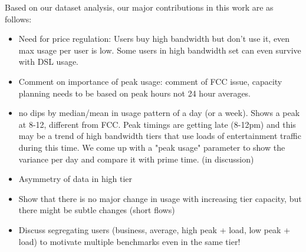 Based on our dataset analysis, our major contributions in this work are as follows:
\begin{itemize}
\item Need for price regulation: Users buy high bandwidth but don't use it, even max usage per user is low. Some users in high bandwidth set can even survive with DSL usage. %
\item Comment on importance of peak usage: comment of FCC issue, capacity planning needs to be based on peak hours not 24 hour averages. 
\item no dips by median/mean in usage pattern of a day (or a week). Shows a peak at 8-12, different from FCC. Peak timings are getting late (8-12pm) and this may be a trend of high bandwidth tiers that use loads of entertainment traffic during this time. We come up with a "peak usage" parameter to show the variance per day and compare it with prime time. (in discussion)
\item Asymmetry of data in high tier %
\item Show that there is no major change in usage with increasing tier capacity, but there might be subtle changes (short flows) %
\item Discuss segregating users (business, average, high peak + load, low peak + load) to motivate multiple benchmarks even in the same tier! %
\end{itemize}



%



